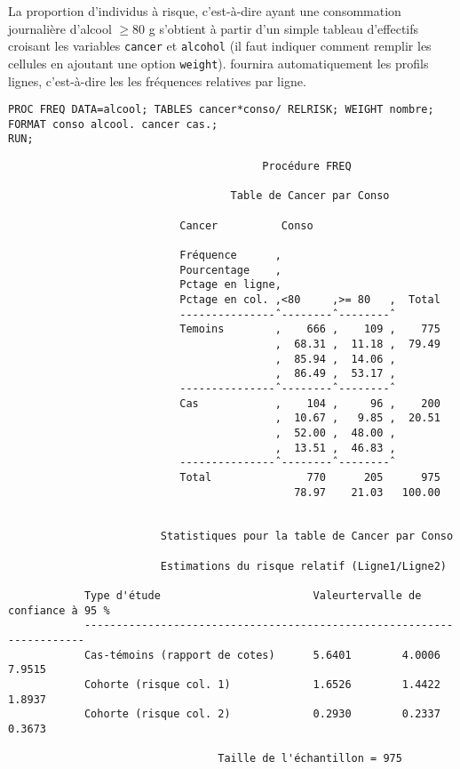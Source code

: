 La proportion d'individus à risque, c'est-à-dire ayant une consommation
journalière d'alcool $\ge 80$ g s'obtient à partir d'un simple tableau
d'effectifs croisant les variables \texttt{cancer} et \texttt{alcohol} (il
faut indiquer comment remplir les cellules en ajoutant une option
\texttt{weight}). \SAS fournira automatiquement les profils lignes,
c'est-à-dire les les fréquences relatives par ligne.
\begin{verbatim}
PROC FREQ DATA=alcool; TABLES cancer*conso/ RELRISK; WEIGHT nombre;
FORMAT conso alcool. cancer cas.;
RUN;
\end{verbatim}

\begin{verbatim}
                                        Procédure FREQ

                                   Table de Cancer par Conso

                           Cancer          Conso

                           Fréquence      ‚
                           Pourcentage    ‚
                           Pctage en ligne‚
                           Pctage en col. ‚<80     ‚>= 80   ‚  Total
                           ---------------ˆ--------ˆ--------ˆ
                           Temoins        ‚    666 ‚    109 ‚    775
                                          ‚  68.31 ‚  11.18 ‚  79.49
                                          ‚  85.94 ‚  14.06 ‚
                                          ‚  86.49 ‚  53.17 ‚
                           ---------------ˆ--------ˆ--------ˆ
                           Cas            ‚    104 ‚     96 ‚    200
                                          ‚  10.67 ‚   9.85 ‚  20.51
                                          ‚  52.00 ‚  48.00 ‚
                                          ‚  13.51 ‚  46.83 ‚
                           ---------------ˆ--------ˆ--------ˆ
                           Total               770      205      975
                                             78.97    21.03   100.00


                        Statistiques pour la table de Cancer par Conso

                        Estimations du risque relatif (Ligne1/Ligne2)

            Type d'étude                        Valeurtervalle de confiance à 95 %
            ----------------------------------------------------------------------
            Cas-témoins (rapport de cotes)      5.6401        4.0006        7.9515
            Cohorte (risque col. 1)             1.6526        1.4422        1.8937
            Cohorte (risque col. 2)             0.2930        0.2337        0.3673

                                 Taille de l'échantillon = 975
\end{verbatim}


